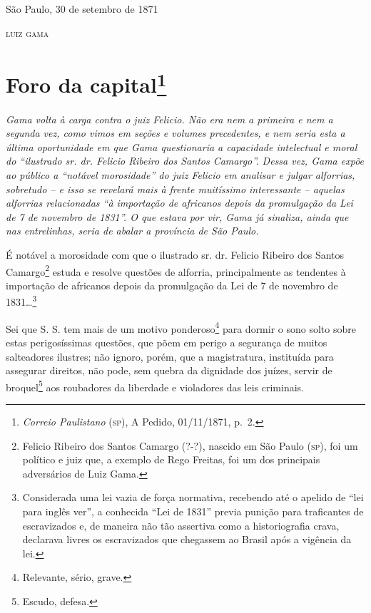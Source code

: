 \begin{flushright}
São Paulo, 30 de setembro de 1871

\textsc{luiz gama}
\end{flushright}

\chapter{Foro da capital\footnote{\emph{Correio Paulistano} (\textsc{sp}), A Pedido, 01/11/1871,
  p.~2.}} %

\begin{didascalia}
\emph{Gama volta à carga contra o juiz Felicio. Não era nem a primeira e
nem a segunda vez, como vimos em seções e volumes precedentes, e nem
seria esta a última oportunidade em que Gama questionaria a capacidade
intelectual e moral do ``ilustrado sr. dr. Felicio Ribeiro dos Santos
Camargo''. Dessa vez, Gama expõe ao público a ``notável morosidade'' do
juiz Felicio em analisar e julgar alforrias, sobretudo -- e isso se
revelará mais à frente muitíssimo interessante -- aquelas alforrias
relacionadas ``à importação de africanos depois da promulgação da Lei de
7 de novembro de 1831''. O que estava por vir, Gama já sinaliza, ainda
que nas entrelinhas, seria de abalar a província de São Paulo.}
\end{didascalia}

É notável a morosidade com que o ilustrado sr. dr. Felicio Ribeiro dos
Santos Camargo\footnote{ Felicio Ribeiro dos Santos Camargo (?-?),
  nascido em São Paulo (\textsc{sp}), foi um político e juiz que, a exemplo de
  Rego Freitas, foi um dos principais adversários de Luiz Gama.} estuda
e resolve questões de alforria, principalmente as tendentes à importação
de africanos depois da promulgação da Lei de 7 de novembro de
1831\ldots{}\footnote{ Considerada uma lei vazia de força normativa,
  recebendo até o apelido de ``lei para inglês ver'', a conhecida ``Lei de
  1831'' previa punição para traficantes de escravizados e, de maneira
  não tão assertiva como a historiografia crava, declarava livres os
  escravizados que chegassem ao Brasil após a vigência da lei.}

Sei que S. S. tem mais de um motivo ponderoso\footnote{ Relevante,
  sério, grave.} para dormir o sono solto sobre estas perigosíssimas
questões, que põem em perigo a segurança de muitos salteadores ilustres;
não ignoro, porém, que a magistratura, instituída para assegurar
direitos, não pode, sem quebra da dignidade dos juízes, servir de
broquel\footnote{ Escudo, defesa.} aos roubadores da liberdade e
violadores das leis criminais.

